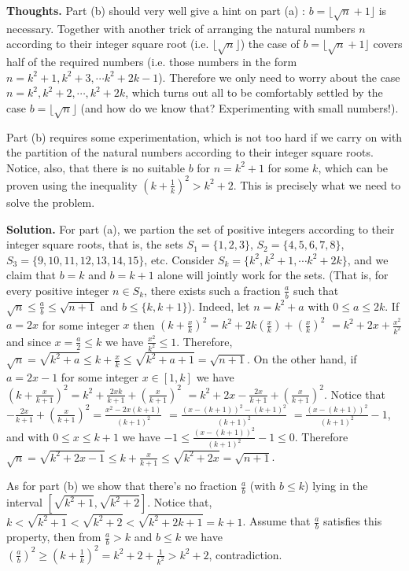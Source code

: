\documentclass[11pt,a4paper]{article}
\begin{document}
\begin{itemize}
\textbf{Thoughts.} 
Part (b) should very well give a hint on part (a) : $b=\lfloor\sqrt{n}+1\rfloor$ is necessary. 
Together with another trick of arranging the natural numbers $n$ according to their integer square root 
(i.e. $\lfloor\sqrt{n}\rfloor$) the case of $b=\lfloor\sqrt{n}+1\rfloor$ covers half of the required numbers 
(i.e. those numbers in the form $n=k^2+1, k^2+3, \cdots k^2+2k-1$). 
Therefore we only need to worry about the case $n=k^2, k^2+2, \cdots , k^2+2k$, 
which turns out all to be comfortably settled by the case $b=\lfloor\sqrt{n}\rfloor$
(and how do we know that? Experimenting with small numbers!). 

Part (b) requires some experimentation, which is not too hard if we carry on with the partition of the natural numbers according to their integer square roots. 
Notice, also, that there is no suitable $b$ for $n=k^2+1$ for some $k$, which can be proven using the inequality 
$(k+\frac 1k)^2>k^2+2$. This is precisely what we need to solve the problem. 

\textbf{Solution.} 
For part (a), we partion the set of positive integers according to their integer square roots, 
that is, the sets $S_1=\{1,2,3\}$, $S_2=\{4,5,6,7,8\}$, $S_3=\{9,10,11,12,13,14,15\}$, etc. 
Consider $S_k=\{k^2, k^2+1, \cdots k^2+2k\}$, 
and we claim that $b=k$ and $b=k+1$ alone will jointly work for the sets. 
(That is, for every positive integer $n\in S_k$, there exists such a fraction $\frac{a}{b}$ such that $\sqrt{n} \le \frac{a}{b} \le \sqrt{n+1}$ and $b \le \{k, k+1\}$). 
Indeed, let $n=k^2+a$ with $0\le a\le 2k$. 
If $a=2x$ for some integer $x$ then 
$(k+\frac xk)^2=k^2+ 2k\left(\frac xk\right)+\left(\frac xk\right)^2$
$=k^2+2x+\frac{x^2}{k^2}$
and since $x=\frac a2\le k$ we have $\frac{x^2}{k^2}\le 1$. 
Therefore, 
$\sqrt{n}=\sqrt{k^2+a}\le k+\frac xk\le\sqrt{k^2+a+1}=\sqrt{n+1}$. 
On the other hand, if $a=2x-1$ for some integer $x\in [1, k]$ we have 
$(k+\frac x{k+1})^2=k^2+\frac{2xk}{k+1}+(\frac x{k+1})^2$
$=k^2+2x-\frac{2x}{k+1}+(\frac x{k+1})^2$. 
Notice that $-\frac{2x}{k+1}+(\frac x{k+1})^2=\frac{x^2-2x(k+1)}{(k+1)^2}$
$=\frac{(x-(k+1))^2-(k+1)^2}{(k+1)^2}$
$=\frac{(x-(k+1))^2}{(k+1)^2}-1$, 
and with $0\le x\le k+1$ we have 
$-1\le \frac{(x-(k+1))^2}{(k+1)^2}-1\le 0$. 
Therefore 
$\sqrt{n}=\sqrt{k^2+2x-1}\le k+\frac x{k+1}\le \sqrt{k^2+2x}=\sqrt{n+1}$. 

As for part (b) we show that there's no fraction $\frac ab$ (with $b\le k$) lying in the interval $[\sqrt{k^2+1}, \sqrt{k^2+2}]$. 
Notice that, $k< \sqrt{k^2+1} < \sqrt{k^2+2} < \sqrt{k^2+2k+1} =k+1$. 
Assume that $\frac ab$ satisfies this property, 
then from $\frac ab > k$ and $b\le k$ we have 
$(\frac ab)^2\ge (k+\frac 1k)^2=k^2+2+\frac 1{k^2} > k^2+2$, contradiction. 


\end{itemize}
\end{document}

